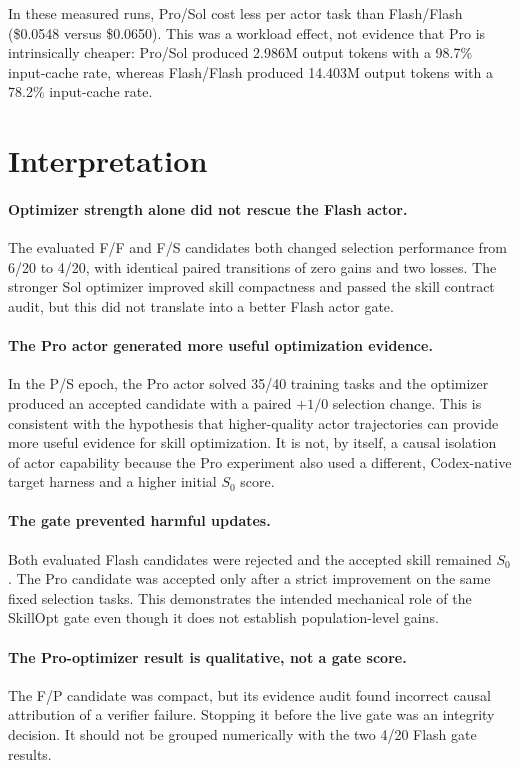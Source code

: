 \documentclass[11pt]{article}
\begin{document}
In these measured runs, Pro/Sol cost less per actor task than Flash/Flash
(\$0.0548 versus \$0.0650). This was a workload effect, not evidence that Pro
is intrinsically cheaper: Pro/Sol produced 2.986M output tokens with a 98.7\%
input-cache rate, whereas Flash/Flash produced 14.403M output tokens with a
78.2\% input-cache rate.

\section{Interpretation}

\paragraph{Optimizer strength alone did not rescue the Flash actor.}
The evaluated F/F and F/S candidates both changed selection performance from
6/20 to 4/20, with identical paired transitions of zero gains and two losses.
The stronger Sol optimizer improved skill compactness and passed the skill
contract audit, but this did not translate into a better Flash actor gate.

\paragraph{The Pro actor generated more useful optimization evidence.}
In the P/S epoch, the Pro actor solved 35/40 training tasks and the optimizer
produced an accepted candidate with a paired $+1/0$ selection change. This is
consistent with the hypothesis that higher-quality actor trajectories can
provide more useful evidence for skill optimization. It is not, by itself, a
causal isolation of actor capability because the Pro experiment also used a
different, Codex-native target harness and a higher initial $S_0$ score.

\paragraph{The gate prevented harmful updates.}
Both evaluated Flash candidates were rejected and the accepted skill remained
$S_0$. The Pro candidate was accepted only after a strict improvement on the
same fixed selection tasks. This demonstrates the intended mechanical role of
the SkillOpt gate even though it does not establish population-level gains.

\paragraph{The Pro-optimizer result is qualitative, not a gate score.}
The F/P candidate was compact, but its evidence audit found incorrect causal
attribution of a verifier failure. Stopping it before the live gate was an
integrity decision. It should not be grouped numerically with the two 4/20
Flash gate results.
\end{document}
